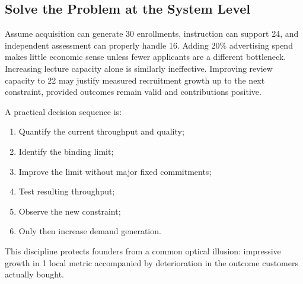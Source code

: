 \subsection{Solve the Problem at the System Level}
\label{sec:solve_problem_system_level}

Assume acquisition can generate 30 enrollments, instruction can support 24, and independent assessment can properly handle 16. Adding 20\% advertising spend makes little economic sense unless fewer applicants are a different bottleneck. Increasing lecture capacity alone is similarly ineffective. Improving review capacity to 22 may justify measured recruitment growth up to the next constraint, provided outcomes remain valid and contributions positive.

A practical decision sequence is:
\begin{enumerate}
    \item Quantify the current throughput and quality;
    \item Identify the binding limit;
    \item Improve the limit without major fixed commitments;
    \item Test resulting throughput;
    \item Observe the new constraint;
    \item Only then increase demand generation.
\end{enumerate}
This discipline protects founders from a common optical illusion: impressive growth in 1 local metric accompanied by deterioration in the outcome customers actually bought.
